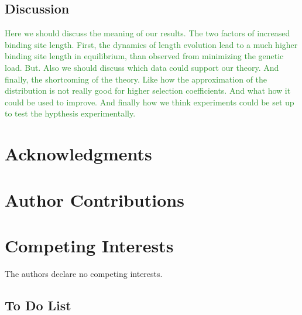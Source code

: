 \documentclass[10pt,a4paper]{article}
\begin{document}
\subsection*{Discussion}
\textcolor{ForestGreen}{Here we should discuss the meaning of our results. The two factors of increased binding site length. First, the dynamics of length evolution lead to a much higher binding site length in equilibrium, than observed from minimizing the genetic load. But. Also we should discuss which data could support our theory. And finally, the shortcoming of the theory. Like how the approximation of the distribution is not really good for higher selection coefficients. And what how it could be used to improve. And finally how we think experiments could be set up to test the hypthesis experimentally.}






\section*{Acknowledgments}


\section*{Author Contributions}


\section*{Competing Interests}
The authors declare no competing interests.

\clearpage
\subsection*{To Do List}
	
\end{document}

